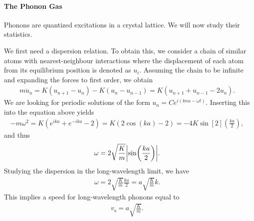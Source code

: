
\paragraph{The Phonon Gas}
Phonons are quantized excitations in a crystal lattice. We will now study their statistics.

We first need a dispersion relation. To obtain this, we consider a chain of similar atoms with nearest-neighbour interactions where the displacement of each atom from its equilibrium position is denoted as $u_{i}$. Assuming the chain to be infinite and expanding the forces to first order, we obtain
\begin{align*}
	m\ddot{u}_{n} = K(u_{n + 1} - u_{n}) - K(u_{n} - u_{n - 1}) = K(u_{n + 1} + u_{n - 1} - 2u_{n}).
\end{align*}
We are looking for periodic solutions of the form $u_{n} = Ce^{i(kna - \omega t)}$. Inserting this into the equation above yields
\begin{align*}
	-m\omega^{2} = K(e^{ika} + e^{-ika} - 2) = K(2\cos(ka) - 2) = -4K\sin[2](\frac{ka}{2}),
\end{align*}
and thus
\begin{align*}
	\omega = 2\sqrt{\frac{K}{m}}\abs{\sin(\frac{ka}{2})}.
\end{align*}
Studying the dispersion in the long-wavelength limit, we have
\begin{align*}
	\omega = 2\sqrt{\frac{K}{m}}\frac{ka}{2} = a\sqrt{\frac{K}{m}}k.
\end{align*}
This implies a speed for long-wavelength phonons equal to
\begin{align*}
	v_{\text{s}} = a\sqrt{\frac{K}{m}}.
\end{align*}

